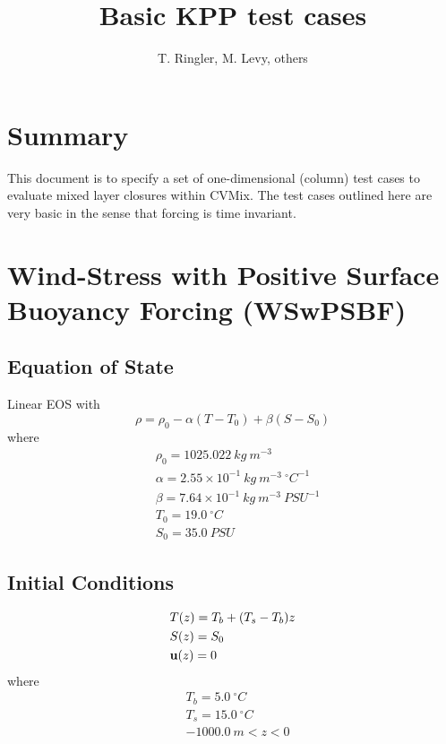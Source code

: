 \documentclass[fleqn, 12pt]{report}
\begin{document}
\title{
Basic KPP test cases}
\author{T. Ringler, M. Levy, others}

\maketitle
\tableofcontents


\chapter{Summary}
This document is to specify a set of one-dimensional (column) test cases to evaluate mixed layer closures within CVMix. The test cases outlined here are very basic in the sense that forcing is time invariant.

\chapter{Wind-Stress with Positive Surface Buoyancy Forcing (WSwPSBF)}

\section{Equation of State}
Linear EOS with
\begin{equation}
\rho = \rho_0 - \alpha (T-T_0) + \beta (S-S_0)
\end{equation}
where 
\begin{align*}
&\rho_0=1025.022 \ kg \ m^{-3} \\
&\alpha=2.55\times10^{-1} \ kg \ m^{-3} \ ^{\circ}C^{-1} \\
&\beta=7.64\times10^{-1} \ kg \ m^{-3} \ {PSU}^{-1} \\
&T_0= 19.0 \ ^{\circ}C \\
&S_0=35.0 \ PSU 
\end{align*}

\section{Initial Conditions}

\begin{align*}
&T(z) = T_b + (T_s - T_b)z  \\
&S(z) = S_0 \\
&{\bf u}(z) = 0
\end{align*}
where
\begin{align*}
&T_b=5.0 \ ^{\circ}C \\
&T_s=15.0 \ ^{\circ}C \\
&-1000.0 \ m <z<0
\end{align*}
\end{document}
